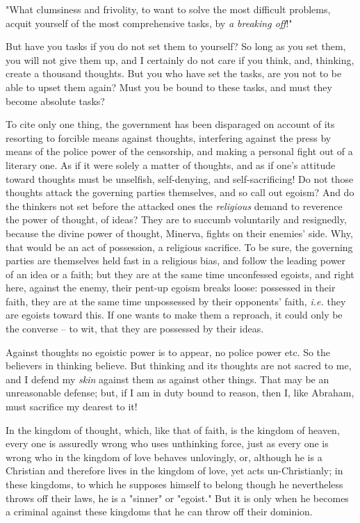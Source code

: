 "{}What clumsiness and frivolity, to want to solve the most difficult 
problems, acquit yourself of the most comprehensive tasks, by \textit{a 
breaking off}!"{}

But have you tasks if you do not set them to yourself? So long as you set 
them, you will not give them up, and I certainly do not care if you think, 
and, thinking, create a thousand thoughts. But you who have set the tasks, are 
you not to be able to upset them again? Must you be bound to these tasks, and 
must they become absolute tasks?

To cite only one thing, the government has been disparaged on account of its 
resorting to forcible means against thoughts, interfering against the press by 
means of the police power of the censorship, and making a personal fight out 
of a literary one. As if it were solely a matter of thoughts, and as if one's 
attitude toward thoughts must be unselfish, self-denying, and 
self-sacrificing! Do not those thoughts attack the governing parties 
themselves, and so call out egoism? And do the thinkers not set before the 
attacked ones the \textit{religious} demand to reverence the power of thought, 
of ideas? They are to succumb voluntarily and resignedly, because the divine 
power of thought, Minerva, fights on their enemies' side. Why, that would be 
an act of possession, a religious sacrifice. To be sure, the governing parties 
are themselves held fast in a religious bias, and follow the leading power of 
an idea or a faith; but they are at the same time unconfessed egoists, and 
right here, against the enemy, their pent-up egoism breaks loose: possessed in 
their faith, they are at the same time unpossessed by their opponents' faith, 
\textit{i.e.} they are egoists toward this. If one wants to make them a 
reproach, it could only be the converse -- to wit, that they are possessed by 
their ideas.

Against thoughts no egoistic power is to appear, no police power etc. So the 
believers in thinking believe. But thinking and its thoughts are not sacred to 
me, and I defend my \textit{skin} against them as against other things. That 
may be an unreasonable defense; but, if I am in duty bound to reason, then I, 
like Abraham, must sacrifice my dearest to it!

In the kingdom of thought, which, like that of faith, is the kingdom of 
heaven, every one is assuredly wrong who uses unthinking force, just as every 
one is wrong who in the kingdom of love behaves unlovingly, or, although he is 
a Christian and therefore lives in the kingdom of love, yet acts 
un-Christianly; in these kingdoms, to which he supposes himself to belong 
though he nevertheless throws off their laws, he is a "{}sinner"{} or 
"{}egoist."{} But it is only when he becomes a criminal against these kingdoms 
that he can throw off their dominion.

